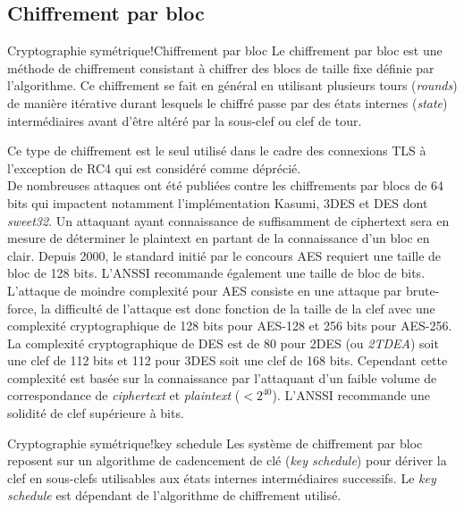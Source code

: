 \subsection{Chiffrement par bloc}
\begin{Define}{Cryptographie symétrique!Chiffrement par bloc}
Le chiffrement par bloc est une méthode de chiffrement consistant à chiffrer des blocs de taille fixe définie par l'algorithme. Ce chiffrement se fait en général en utilisant plusieurs tours (\textit{rounds}) de manière itérative durant lesquels le chiffré passe par des états internes (\textit{state}) intermédiaires avant d'être altéré par la sous-clef ou clef de tour.
\end{Define}
Ce type de chiffrement est le seul utilisé dans le cadre des connexions TLS à l'exception de RC4 qui est considéré comme déprécié. \\
De nombreuses attaques ont été publiées contre les chiffrements par blocs de 64 bits qui impactent notamment l'implémentation Kasumi, 3DES et DES dont \textit{sweet32}. Un attaquant ayant connaissance de suffisamment de ciphertext sera en mesure de déterminer le plaintext en partant de la connaissance d'un bloc en clair. Depuis 2000, le standard initié par le concours AES requiert une taille de bloc de 128 bits. L'ANSSI recommande également une taille de bloc de \blockrecosizeAnssi bits.\\
L'attaque de moindre complexité pour AES consiste en une attaque par brute-force, la difficulté de l'attaque est donc fonction de la taille de la clef avec une complexité cryptographique de 128 bits pour AES-128 et 256 bits pour AES-256. La complexité cryptographique de DES est de 80 pour 2DES (ou \textit{2TDEA}) soit une clef de 112 bits et 112 pour 3DES soit une clef de 168 bits. Cependant cette complexité est basée sur la connaissance par l'attaquant d'un faible volume de correspondance de \textit{ciphertext} et \textit{plaintext} ($<2^{40}$). L'ANSSI recommande une solidité de clef supérieure à \solidityrecosizeAnssi bits.

\begin{Define}{Cryptographie symétrique!key schedule}
Les système de chiffrement par bloc reposent sur un algorithme de cadencement de clé (\textit{key schedule}) pour dériver la clef en sous-clefs utilisables aux états internes intermédiaires successifs. Le \textit{key schedule} est dépendant de l'algorithme de chiffrement utilisé.
\end{Define}

